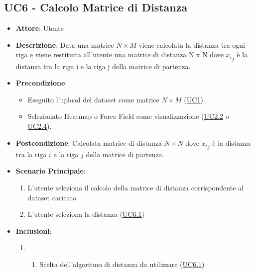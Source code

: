     \subsection{UC6 - Calcolo Matrice di Distanza}
    \begin{itemize}
    \item \textbf{Attore}: Utente
    \item \textbf{Descrizione}: Data una matrice $N \times M$ viene calcolata la distanza tra ogni riga e viene restituita all'utente una matrice di distanza N x N dove ${x_i}_j$ è la distanza tra la riga i e la riga j della matrice di partenza.
    \item \textbf{Precondizione}: 
    \begin{itemize}
        \item Eseguito l'upload del dataset come matrice $N\times M$ (\hyperref[uc1]{UC1}).
        \item Selezionato Heatmap o Force Field come visualizzazione (\hyperref[uc2.2]{UC2.2} o \hyperref[uc2.4]{UC2.4}).
    \end{itemize}  
    \item \textbf{Postcondizione}: Calcolata matrice di distanza $N \times N$ dove ${x_i}_j$ è la distanza tra la riga $i$ e la riga $j$ della matrice di partenza.
    \item \textbf{Scenario Principale}: 
    \begin{enumerate}
        \item L'utente seleziona il calcolo della matrice di distanza corrispondente al dataset caricato
        \item L'utente seleziona la distanza (\hyperref[uc6.1]{UC6.1})
    \end{enumerate}  
    \item \textbf{Inclusioni}:
        \begin{enumerate}
                \item \begin{enumerate}
                    \item Scelta dell'algoritmo di distanza da utilizzare (\hyperref[uc6.1]{UC6.1})
                \end{enumerate}
        \end{enumerate} 
    \end{itemize}
    
